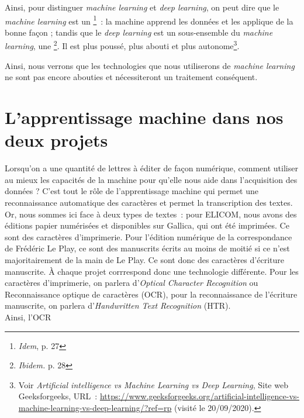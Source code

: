 Ainsi, pour distinguer \emph{machine learning} et \emph{deep learning}, on peut dire que le \emph{machine learning} est un \footnote{\emph{Idem}, p. 27}~: la machine apprend les données et les applique de la bonne façon ; tandis que le \emph{deep learning} est un sous-ensemble du \emph{machine learning}, une \footnote{\emph{Ibidem.} p. 28}. Il est plus poussé, plus abouti et plus autonome\footnote{Voir \emph{Artificial intelligence vs Machine Learning vs Deep Learning}, Site web Geeksforgeeks, URL~: \url{https://www.geeksforgeeks.org/artificial-intelligence-vs-machine-learning-vs-deep-learning/?ref=rp} (visité le 20/09/2020).}.

Ainsi, nous verrons que les technologies que nous utiliserons de \emph{machine learning} ne sont pas encore abouties et nécessiteront un traitement conséquent. 

\section{L'apprentissage machine dans nos deux projets}

Lorsqu'on a une quantité de lettres à éditer de façon numérique, comment utiliser au mieux les capacités de la machine pour qu'elle nous aide dans l'acquisition des données ?
C'est tout le rôle de l'apprentissage machine qui permet une reconnaissance automatique des caractères et permet la transcription des textes. Or, nous sommes ici face à deux types de textes~: pour ELICOM, nous avons des éditions papier numérisées et disponibles sur Gallica, qui ont été imprimées. Ce sont des caractères d'imprimerie. Pour l'édition numérique de la correspondance de Frédéric Le Play, ce sont des manuscrits écrits au moins de moitié si ce n'est majoritairement de la main de Le Play. Ce sont donc des caractères d'écriture manuscrite. À chaque projet corrrespond donc une technologie différente. Pour les caractères d'imprimerie, on parlera d'\emph{Optical Character Recognition} ou Reconnaissance optique de caractères (OCR), pour la reconnaissance de l'écriture manuscrite, on parlera d'\emph{Handwritten Text Recognition} (HTR). \\

Ainsi, l'OCR\begin{quote}
\end{quote}

